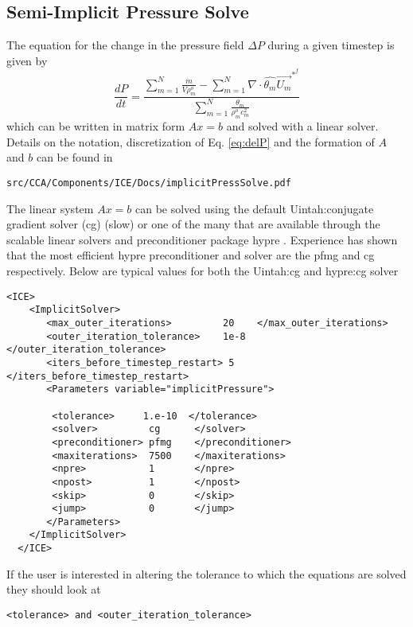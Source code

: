 \subsection{Semi-Implicit Pressure Solve}
The equation for the change in the pressure field $\Delta{P}$ during a given timestep is given by
%
\begin{equation}
    \label{eq:delP}
     \frac{dP}{dt} = 
     \frac{\sum \limits_{{m}=1}^N  \frac{\dot{m}} {V \rho^{o}_m} 
        -  \sum \limits_{{m}=1}^N \nabla \cdot \widehat{\theta_m} \vec{U_m}^{*^{f}}}
          {\sum \limits_{{m}=1}^N \frac{\theta_m}{\rho^{o}_m c_m^2} }
\end{equation}
%
which can be written in matrix form $Ax = b$ and solved with a linear solver.  Details on the notation, discretization of Eq. \ref{eq:delP} and the formation of $A$ and $b$ can be found in
%
\begin{Verbatim}[fontsize=\footnotesize]
  src/CCA/Components/ICE/Docs/implicitPressSolve.pdf
\end{Verbatim}
%
The linear system $Ax = b$ can be solved using the default Uintah:conjugate gradient solver (cg) (slow) or one of the many that are available through the scalable linear solvers and preconditioner package hypre \cite{ref:hypre}. Experience has shown that the most efficient hypre preconditioner and solver are the pfmg and cg respectively.  Below are typical values for both the Uintah:cg and hypre:cg solver %
\begin{Verbatim}[fontsize=\footnotesize]
  <ICE>
    <ImplicitSolver>
       <max_outer_iterations>         20    </max_outer_iterations>
       <outer_iteration_tolerance>    1e-8  </outer_iteration_tolerance>
       <iters_before_timestep_restart> 5    </iters_before_timestep_restart>
       <Parameters variable="implicitPressure">

        <tolerance>     1.e-10  </tolerance>
        <solver>         cg      </solver>
        <preconditioner> pfmg    </preconditioner>
        <maxiterations>  7500    </maxiterations>
        <npre>           1       </npre>
        <npost>          1       </npost>
        <skip>           0       </skip>
        <jump>           0       </jump>
       </Parameters>
    </ImplicitSolver>
  </ICE>
\end{Verbatim}
%
If the user is interested in altering the tolerance to which the equations are solved they should look at
%
\begin{Verbatim}[fontsize=\footnotesize]
  <tolerance> and <outer_iteration_tolerance>
\end{Verbatim} 
%

